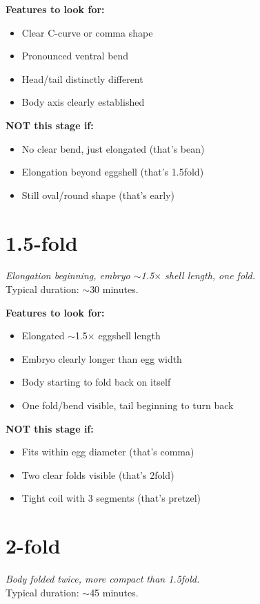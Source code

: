 \documentclass[11pt,letterpaper]{article}
\begin{document}
\textbf{Features to look for:}
\begin{itemize}
    \item Clear C-curve or comma shape
    \item Pronounced ventral bend
    \item Head/tail distinctly different
    \item Body axis clearly established
\end{itemize}

\textbf{NOT this stage if:}
\begin{itemize}
    \item No clear bend, just elongated (that's bean)
    \item Elongation beyond eggshell (that's 1.5fold)
    \item Still oval/round shape (that's early)
\end{itemize}

\section{1.5-fold}
\textit{Elongation beginning, embryo $\sim$1.5$\times$ shell length, one fold.}\\
Typical duration: $\sim$30 minutes.

\textbf{Features to look for:}
\begin{itemize}
    \item Elongated $\sim$1.5$\times$ eggshell length
    \item Embryo clearly longer than egg width
    \item Body starting to fold back on itself
    \item One fold/bend visible, tail beginning to turn back
\end{itemize}

\textbf{NOT this stage if:}
\begin{itemize}
    \item Fits within egg diameter (that's comma)
    \item Two clear folds visible (that's 2fold)
    \item Tight coil with 3 segments (that's pretzel)
\end{itemize}

\section{2-fold}
\textit{Body folded twice, more compact than 1.5fold.}\\
Typical duration: $\sim$45 minutes.
\end{document}
